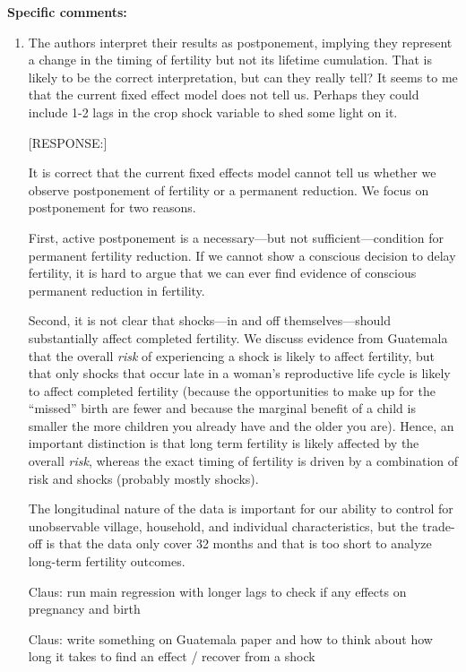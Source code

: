 \documentclass[letterpaper,12pt]{article}
\begin{document}
\noindent \textbf{Specific comments:}

\begin{enumerate}

\item The authors interpret their results as postponement, implying they
represent a change in the timing of fertility but not its lifetime
cumulation. That is likely to be the correct interpretation, but can
they really tell? It seems to me that the current fixed effect model
does not tell us. Perhaps they could include 1-2 lags in the crop shock
variable to shed some light on it.

[RESPONSE:]

It is correct that the current fixed effects model cannot tell
us whether we observe postponement of fertility or a permanent
reduction.
We focus on postponement for two reasons.

First, active postponement is a necessary---but not sufficient---condition
for permanent fertility reduction.
If we cannot show a conscious decision to delay fertility, it is 
hard to argue that we can ever find evidence of conscious permanent 
reduction in fertility.

Second, it is not clear that shocks---in and off themselves---should
substantially affect completed fertility. 
We discuss evidence from Guatemala that the overall \emph{risk} of 
experiencing a shock is likely to affect fertility, but that only
shocks that occur late in a woman's reproductive life cycle is
likely to affect completed fertility (because the opportunities to
make up for the ``missed'' birth are fewer and because the marginal
benefit of a child is smaller the more children you already have and
the older you are).
Hence, an important distinction is that long term fertility is likely
affected by the overall \emph{risk}, whereas the exact timing of
fertility is driven by a combination of risk and shocks (probably
mostly shocks).

The longitudinal nature of the data is important for our ability
to control for unobservable village, household, and individual 
characteristics, but the trade-off is that the data only cover 
32 months and that is too short to analyze long-term fertility
outcomes.
 


Claus: run main regression with longer lags to check if any effects
on pregnancy and birth 

Claus: write something on Guatemala paper and how to think about how
long it takes to find an effect / recover from a shock



\end{enumerate}
\end{document}

